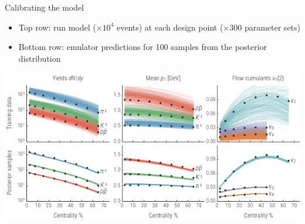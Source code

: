 \documentclass[xcolor=dvipsnames]{beamer}
\begin{document}
\begin{frame}{Calibrating the model}
    \vspace{0.4 cm}
    \begin{itemize}
        \scriptsize
        \item Top row: run model ($\times10^4$ events) at each design point ($\times300$ parameter sets)
        \vspace{0.2 cm}
        \item Bottom row: emulator predictions for 100 samples from the posterior distribution
    \end{itemize}
    \vspace{0.2 cm}
    \includegraphics{observables_plot}
\end{frame}
\end{document}
